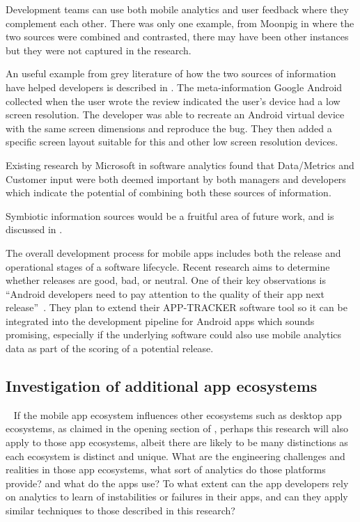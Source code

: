 Development teams can use both mobile analytics and user feedback where they complement each other. There was only one example, from Moonpig in  where the two sources were combined and contrasted, there may have been other instances but they were not captured in the research. 

An useful example from grey literature of how the two sources of information have helped developers is described in . The meta-information Google Android collected when the user wrote the review indicated the user's device had a low screen resolution. The developer was able to recreate an Android virtual device with the same screen dimensions and reproduce the bug. They then added a specific screen layout suitable for this and other low screen resolution devices.

Existing research by Microsoft in software analytics found that Data/Metrics and Customer input were both deemed important by both managers and developers which indicate the potential of combining both these sources of information.~

Symbiotic information sources would be a fruitful area of future work, and is discussed in .

The overall development process for mobile apps includes both the release and operational stages of a software lifecycle. Recent research aims to determine whether releases are good, bad, or neutral. One of their key observations is ``Android developers need to pay attention to the quality of their app next release''~. They plan to extend their \uppercase{App-Tracker} software tool so it can be integrated into the development pipeline for Android apps which sounds promising, especially if the underlying software could also use mobile analytics data as part of the scoring of a potential release.


\subsection{Investigation of additional app ecosystems}~\label{fw-investigate-additional-ecosystems}
If the mobile app ecosystem influences other ecosystems such as desktop app ecosystems, as claimed in the opening section of , perhaps this research will also apply to those app ecosystems, albeit there are likely to be many distinctions as each ecosystem is distinct and unique.  What are the engineering challenges and realities in those app ecosystems, what sort of analytics do those platforms provide? and what do the apps use? To what extent can the app developers rely on analytics to learn of instabilities or failures in their apps, and can they apply similar techniques to those described in this research? 


